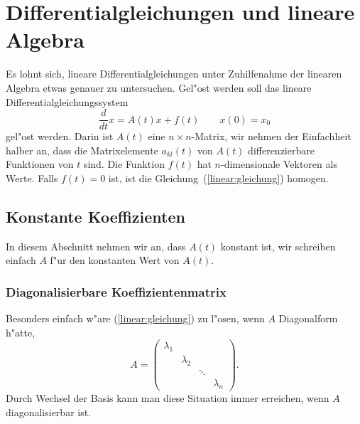 %
%
%
\chapter{Differentialgleichungen und lineare Algebra\label{chapter:linear}}
\lhead{}
Es lohnt sich, lineare Differentialgleichungen unter Zuhilfenahme
der linearen Algebra etwas genauer zu untersuchen.
Gel"ost werden soll das lineare Differentialgleichungssystem
\begin{equation}
\frac{d}{dt}x = A(t)x + f(t)\qquad x(0)=x_0
\label{linear:gleichung}
\end{equation}
gel"ost werden.
Darin ist $A(t)$ eine $n\times n$-Matrix, wir nehmen der Einfachheit
halber an, dass die Matrixelemente $a_{kl}(t)$ von $A(t)$ differenzierbare
Funktionen von $t$ sind.
Die Funktion $f(t)$ hat $n$-dimensionale Vektoren als Werte.
Falls $f(t)=0$ ist, ist die Gleichung~(\ref{linear:gleichung}) 
homogen.

\section{Konstante Koeffizienten}
In diesem Abschnitt nehmen wir an, dass $A(t)$ konstant ist, wir schreiben
einfach $A$ f"ur den konstanten Wert von $A(t)$.
\subsection{Diagonalisierbare Koeffizientenmatrix}
Besonders einfach w"are (\ref{linear:gleichung}) zu l"osen, wenn $A$
Diagonalform h"atte,
\[
A=\begin{pmatrix}
\lambda_1&         &      &         \\
         &\lambda_2&      &         \\
         &         &\ddots&         \\
         &         &      &\lambda_n
\end{pmatrix}.
\]
Durch Wechsel der Basis kann man diese Situation immer erreichen, wenn
$A$ diagonalisierbar ist.

